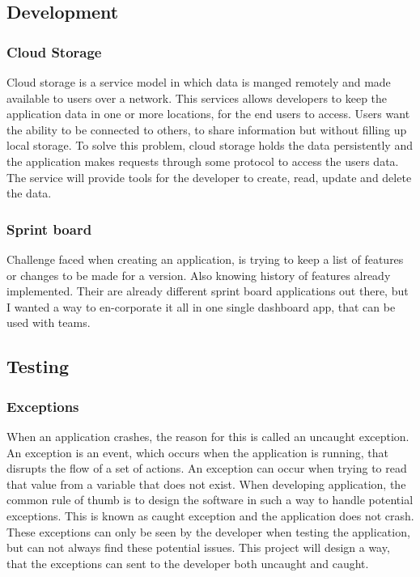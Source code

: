 \subsection{Development}

\subsubsection{Cloud Storage}

Cloud storage is a service model in which data is manged remotely and made available to users over a network. This services allows developers to keep the application data in one or more locations, for the end users to access. Users want the ability to be connected to others, to share information but without filling up local storage. To solve this problem, cloud storage holds the data persistently and the application makes requests through some protocol to access the users data. The service will provide tools for the developer to create, read, update and delete the data.

\subsubsection{Sprint board}
Challenge faced when creating an application, is trying to keep a list of features or changes to be made for a version. Also knowing history of features already implemented. Their are already different sprint board applications out there, but I wanted a way to en-corporate it all in one single dashboard app, that can be used with teams.

\subsection{Testing}

\subsubsection{Exceptions}

When an application crashes, the reason for this is called an uncaught exception. An exception is an event, which occurs when the application is running, that disrupts the flow of a set of actions. An exception can occur when trying to read that value from a variable that does not exist. When developing application, the common rule of thumb is to design the software in such a way to handle potential exceptions. This is known as caught exception and the application does not crash. These exceptions can only be seen by the developer when testing the application, but can not always find these potential issues. This project will design a way, that the exceptions can sent to the developer both uncaught and caught.

